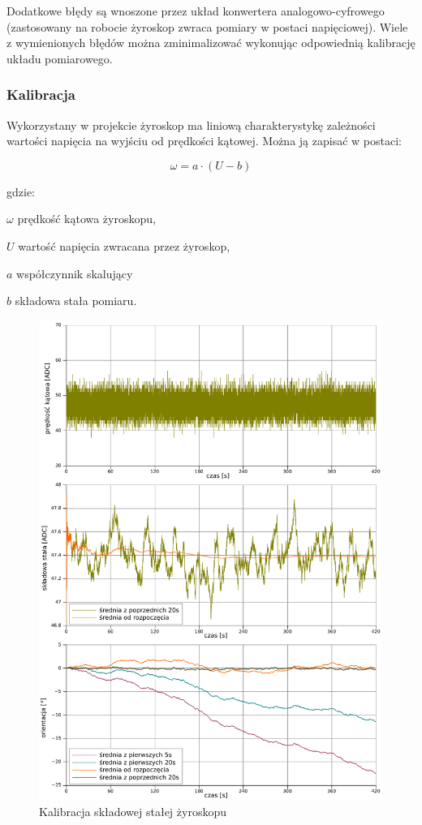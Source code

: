Dodatkowe błędy są wnoszone przez układ konwertera analogowo-cyfrowego
(zastosowany na robocie żyroskop zwraca pomiary w postaci napięciowej).
Wiele z wymienionych błędów można zminimalizować wykonując odpowiednią
kalibrację układu pomiarowego.

\subsubsection{Kalibracja}

Wykorzystany w projekcie żyroskop ma liniową charakterystykę zależności
wartości napięcia na wyjściu od prędkości kątowej. Można ją zapisać w postaci:

\[
\omega = a \cdot (U - b)
\]

gdzie:

\begin{mydescription}{5pt}
\item[$\omega$] prędkość kątowa żyroskopu,
\item[$U$] wartość napięcia zwracana przez żyroskop,
\item[$a$] współczynnik skalujący 
\item[$b$] składowa stała pomiaru. 
\end{mydescription}

\begin{figure}[htp!]
\centering
\includegraphics[width=15.5cm]{../../Common/pomiary/gyro_bias}
\caption{Kalibracja składowej stałej żyroskopu}
\label{fig:gyro_bias}
\end{figure}

